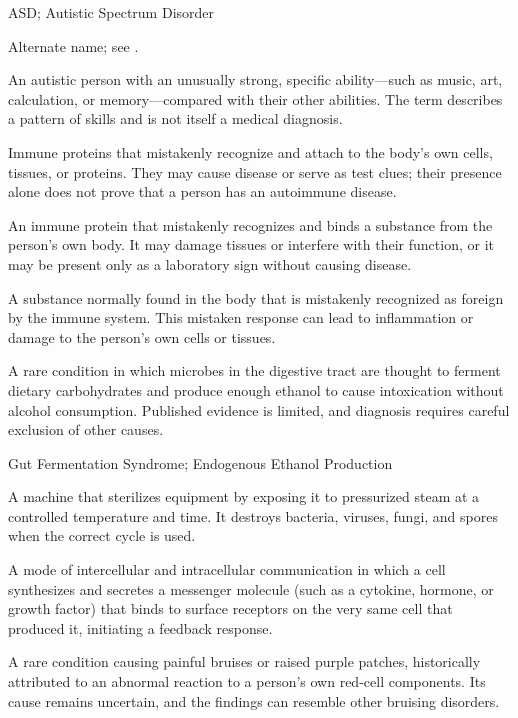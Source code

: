 \synonyms
ASD; Autistic Spectrum Disorder

 Alternate name; see .

 An autistic person with an unusually strong, specific ability—such as music, art, calculation, or memory—compared with their other abilities. The term describes a pattern of skills and is not itself a medical diagnosis.

 Immune proteins that mistakenly recognize and attach to the body's own cells, tissues, or proteins. They may cause disease or serve as test clues; their presence alone does not prove that a person has an autoimmune disease.

 An immune protein that mistakenly recognizes and binds a substance from the person's own body. It may damage tissues or interfere with their function, or it may be present only as a laboratory sign without causing disease.

 A substance normally found in the body that is mistakenly recognized as foreign by the immune system. This mistaken response can lead to inflammation or damage to the person's own cells or tissues.

 A rare condition in which microbes in the digestive tract are thought to ferment dietary carbohydrates and produce enough ethanol to cause intoxication without alcohol consumption. Published evidence is limited, and diagnosis requires careful exclusion of other causes.

\synonyms
Gut Fermentation Syndrome; Endogenous Ethanol Production

 A machine that sterilizes equipment by exposing it to pressurized steam at a controlled temperature and time. It destroys bacteria, viruses, fungi, and spores when the correct cycle is used.

 A mode of intercellular and intracellular communication in which a cell synthesizes and secretes a messenger molecule (such as a cytokine, hormone, or growth factor) that binds to surface receptors on the very same cell that produced it, initiating a feedback response.

 A rare condition causing painful bruises or raised purple patches, historically attributed to an abnormal reaction to a person's own red-cell components. Its cause remains uncertain, and the findings can resemble other bruising disorders.

